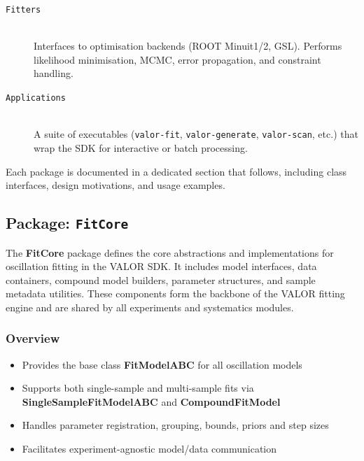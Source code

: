\begin{description}
  \item[\texttt{Fitters}] \hfill \\
  Interfaces to optimisation backends (ROOT Minuit1/2, GSL).
  Performs likelihood minimisation, MCMC, error propagation, and constraint handling.

  \item[\texttt{Applications}] \hfill \\
  A suite of executables (\texttt{valor-fit}, \texttt{valor-generate}, \texttt{valor-scan}, etc.) that wrap the SDK for interactive or batch processing.

\end{description}

Each package is documented in a dedicated section that follows, including class interfaces, design motivations, and usage examples.

%
%
%

\subsection{Package: \texttt{FitCore}}

The {\color{cadmiumgreen} \textbf{FitCore}} package defines the core abstractions and implementations for oscillation fitting in the VALOR SDK.  
It includes model interfaces, data containers, compound model builders, parameter structures, and sample metadata utilities.  
These components form the backbone of the VALOR fitting engine and are shared by all experiments and systematics modules.

\vspace{1em}

\subsubsection*{Overview}

\begin{itemize}
  \item Provides the base class {\color{cadmiumgreen} \textbf{FitModelABC}} for all oscillation models
  \item Supports both single-sample and multi-sample fits via {\color{cadmiumgreen} \textbf{SingleSampleFitModelABC}} and {\color{cadmiumgreen} \textbf{CompoundFitModel}}
  \item Handles parameter registration, grouping, bounds, priors and step sizes
  \item Facilitates experiment-agnostic model/data communication
\end{itemize}

